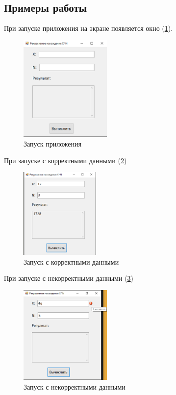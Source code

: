 \subsection{Примеры работы}

При запуске приложения на экране появляется окно (\ref{fig:StartForm3}).

\begin{figure}[!h]
    \centering
    \includegraphics[width = 0.4\textwidth]{images/Task3/Start.png}
    \caption{Запуск приложения}
    \label{fig:StartForm3}
\end{figure}

При запуске с корректными данными (\ref{fig:WorkForm3})

\begin{figure}[!h]
    \centering
    \includegraphics[width = 0.35\textwidth]{images/Task3/Work1.png}
    \caption{Запуск с корректными данными}
    \label{fig:WorkForm3}
\end{figure}

При запуске с некорректными данными (\ref{fig:BadInputNotIntForm3})

\begin{figure}[!h]
    \centering
    \includegraphics[width = 0.4\textwidth]{images/Task3/BadInputNotInt1.png}
    \caption{Запуск с некорректными данными}
    \label{fig:BadInputNotIntForm3}
\end{figure}

